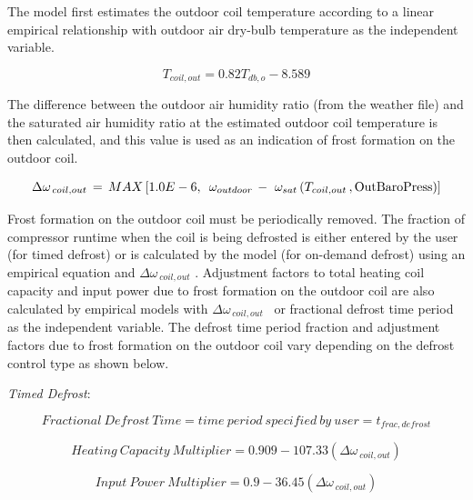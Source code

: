 The model first estimates the outdoor coil temperature according to a linear empirical relationship with outdoor air dry-bulb temperature as the independent variable.

\begin{equation}
{T_{coil,out}} = 0.82{T_{db,o}} - 8.589
\end{equation}

The difference between the outdoor air humidity ratio (from the weather file) and the saturated air humidity ratio at the estimated outdoor coil temperature is then calculated, and this value is used as an indication of frost formation on the outdoor coil.

\begin{equation}
\Delta {\omega_{\,coil,out}}\, = \,MAX\left[ {1.0E - 6,\,\,\,{\omega_{outdoor}}\, - \,\,{\omega_{sat}}\left( {{T_{coil,out}}\,,{\rm{OutBaroPress}}} \right)} \right]
\end{equation}

Frost formation on the outdoor coil must be periodically removed. The fraction of compressor runtime when the coil is being defrosted is either entered by the user (for timed defrost) or is calculated by the model (for on-demand defrost) using an empirical equation and \(\Delta {\omega_{\,coil,out}}\) . Adjustment factors to total heating coil capacity and input power due to frost formation on the outdoor coil are also calculated by empirical models with \(\Delta {\omega_{\,coil,out}}\) ~or fractional defrost time period as the independent variable. The defrost time period fraction and adjustment factors due to frost formation on the outdoor coil vary depending on the defrost control type as shown below.

\emph{Timed Defrost}:

\begin{equation}
Fractional~Defrost~Time = time~period~specified~by~user = {t_{frac,defrost}}
\end{equation}

\begin{equation}
Heating~Capacity~Multiplier = 0.909 - 107.33\left( {\Delta {\omega_{\,coil,out}}} \right)
\label{eq:SSEHPDXHeatingCapacityMultiplierTimedDefrost}
\end{equation}

\begin{equation}
Input~Power~Multiplier = 0.9 - 36.45\left( {\Delta {\omega_{\,coil,out}}} \right)
\label{eq:SSEHPDXInputPowerMultiplierTimedDefrost}
\end{equation}

